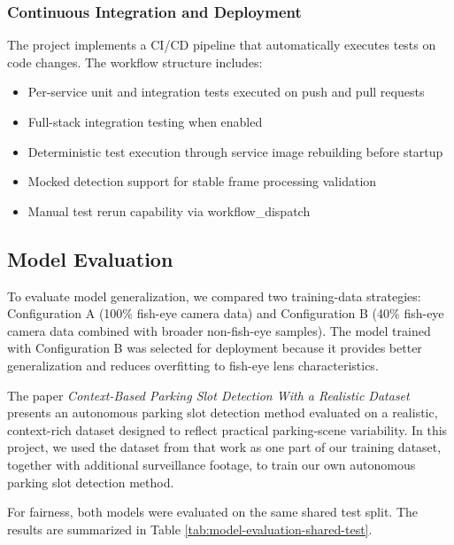 \subsubsection{Continuous Integration and Deployment}

The project implements a CI/CD pipeline that automatically executes tests on code changes. The workflow structure includes:

\begin{itemize}
    \item Per-service unit and integration tests executed on push and pull requests
    \item Full-stack integration testing when enabled
    \item Deterministic test execution through service image rebuilding before startup
    \item Mocked detection support for stable frame processing validation
    \item Manual test rerun capability via workflow\_dispatch
\end{itemize}

\subsection{Model Evaluation}
\label{subsection:model-evaluation}

To evaluate model generalization, we compared two training-data strategies:
Configuration A (100\% fish-eye camera data) and Configuration B (40\%
fish-eye camera data combined with broader non-fish-eye samples). The model
trained with Configuration B was selected for deployment because it provides
better generalization and reduces overfitting to fish-eye lens characteristics.

The paper \textit{Context-Based Parking Slot Detection With a Realistic
Dataset} \cite{context_based_parking_slot_detection_dataset} presents an autonomous parking slot detection method evaluated on a
realistic, context-rich dataset designed to reflect practical parking-scene
variability. In this project, we used the dataset from that work as one part
of our training dataset, together with additional surveillance footage, to
train our own autonomous parking slot detection method.

For fairness, both models were evaluated on the same shared test split. The
results are summarized in Table \ref{tab:model-evaluation-shared-test}.

